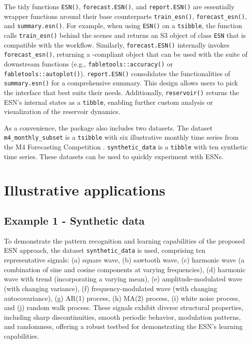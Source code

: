 The tidy functions \texttt{ESN()}, \texttt{forecast.ESN()}, and \texttt{report.ESN()} are essentially wrapper functions around their base counterparts \texttt{train\_esn()}, \texttt{forecast\_esn()}, and \texttt{summary.esn()}. For example, when using \texttt{ESN()} on a \texttt{tsibble}, the function calls \texttt{train\_esn()} behind the scenes and returns an S3 object of class \texttt{ESN} that is compatible with the  workflow. Similarly, \texttt{forecast.ESN()} internally invokes \texttt{forecast\_esn()}, returning a -compliant object that can be used with the suite of downstream functions (e.g., \texttt{fabletools::accuracy()} or \texttt{fabletools::autoplot()}). \texttt{report.ESN()} consolidates the functionalities of \texttt{summary.esn()} for a comprehensive summary. This design allows users to pick the interface that best suits their needs. Additionally, \texttt{reservoir()} returns the ESN's internal states as a \texttt{tibble}, enabling further custom analysis or visualization of the reservoir dynamics.

As a convenience, the package also includes two datasets. The dataset \texttt{m4\_monthly\_subset} is a \texttt{tsibble} with six illustrative monthly time series from the M4 Forecasting Competition \citep{Makridakis2020}. \texttt{synthetic\_data} is a \texttt{tibble} with ten synthetic time series. These datasets can be used to quickly experiment with ESNs.

\section{Illustrative applications}\label{illustrative-applications}

\subsection{Example 1 - Synthetic data}\label{example-1---synthetic-data}

To demonstrate the pattern recognition and learning capabilities of the proposed ESN approach, the dataset \texttt{synthetic\_data} is used, comprising ten representative signals: (a) square wave, (b) sawtooth wave, (c) harmonic wave (a combination of sine and cosine components at varying frequencies), (d) harmonic wave with trend (incorporating a varying mean), (e) amplitude-modulated wave (with changing variance), (f) frequency-modulated wave (with changing autocovariance), (g) AR(1) process, (h) MA(2) process, (i) white noise process, and (j) random walk process. These signals exhibit diverse structural properties, including sharp discontinuities, smooth periodic behavior, modulation patterns, and randomness, offering a robust testbed for demonstrating the ESN's learning capabilities.

